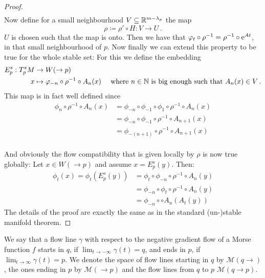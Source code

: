 \begin{proof}
\begin{align*}
	\end{align*} Now define for a small neighbourhood $V\subseteq \mathbb{R}^{m-\lambda_p}$ the map
	\begin{equation*}
		\rho\coloneq \rho'\circ H: V \to U\, .
	\end{equation*} $U$ is chosen such that the map is onto. Then we have that $\varphi_t\circ \rho^{-1}=\rho^{-1} \circ \mathrm{e}^{At}$, in that small neighbourhood of $p$. Now finally we can extend this property to be true for the whole stable set:
	For this we define the embedding
	\begin{align*}
		E^s_p: T^s_pM &\to W(\to p)\\
		x&\mapsto \varphi_{-n} \circ\rho^{-1} \circ A_n(x) \quad \text{ where }n\in \mathbb{N} \text{ is big enough such that }A_n(x)\in V\,.
	\end{align*} This map is in fact well defined since
	\begin{align*}
		\phi_n \circ\rho^{-1} \circ A_n(x)
		&=\phi_{-n} \circ \phi_{-1}\circ \phi_1 \circ \rho^{-1} \circ A_n(x)\\
		&=\phi_{-n} \circ \phi_{-1}\circ \rho^{-1} \circ A_{n+1}(x)\\
		&=\phi_{-(n+1)} \circ \rho^{-1} \circ A_{n+1}(x)\\
	\end{align*}
	
	And obviously the flow compatibility that is given locally by $\rho$ is now true globally: Let $x\in W(\to p)$ and assume $x=E^s_p(y)$. Then:
	\begin{align*}
		\phi_t(x)=\phi_t(E^s_p(y))
		&=\phi_t\circ \phi_{-n}\circ \rho^{-1}\circ A_n(y)\\
		&=\phi_{-n}\circ \phi_t\circ \rho^{-1}\circ A_n(y) \\
		&=\phi_{-n}\circ \circ A_n(A_t(y))
	\end{align*}
	The details of the proof are exactly the same as in the standard (un-)stable manifold theorem.
\end{proof}




\begin{definition}
	We say that a flow line $\gamma$ with respect to the negative gradient flow of a Morse function $f$ starts in $q$, if $\lim_{t\to -\infty} \gamma(t)=q$, and ends in $p$, if $\lim_{t\to \infty}\gamma(t)=p$. We denote the space of flow lines starting in $q$ by $\mathcal{M}(q \to)$, the ones ending in $p$ by $\mathcal{M}(\to p)$ and the flow lines from $q$ to $p$ $\mathcal{M}(q\to p)$.
\end{definition}





